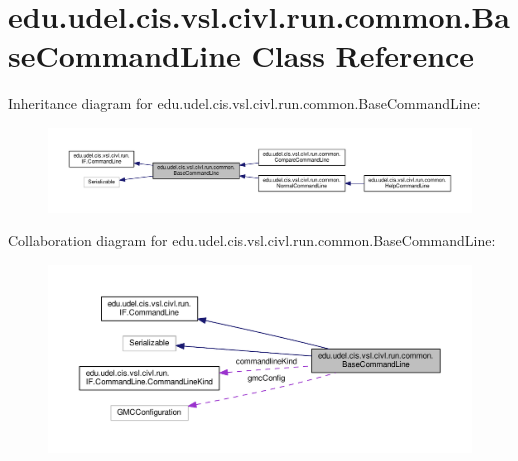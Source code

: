 \hypertarget{classedu_1_1udel_1_1cis_1_1vsl_1_1civl_1_1run_1_1common_1_1BaseCommandLine}{}\section{edu.\+udel.\+cis.\+vsl.\+civl.\+run.\+common.\+Base\+Command\+Line Class Reference}
\label{classedu_1_1udel_1_1cis_1_1vsl_1_1civl_1_1run_1_1common_1_1BaseCommandLine}


Inheritance diagram for edu.\+udel.\+cis.\+vsl.\+civl.\+run.\+common.\+Base\+Command\+Line\+:
\nopagebreak
\begin{figure}[H]
\begin{center}
\leavevmode
\includegraphics[width=350pt]{classedu_1_1udel_1_1cis_1_1vsl_1_1civl_1_1run_1_1common_1_1BaseCommandLine__inherit__graph}
\end{center}
\end{figure}


Collaboration diagram for edu.\+udel.\+cis.\+vsl.\+civl.\+run.\+common.\+Base\+Command\+Line\+:
\nopagebreak
\begin{figure}[H]
\begin{center}
\leavevmode
\includegraphics[width=350pt]{classedu_1_1udel_1_1cis_1_1vsl_1_1civl_1_1run_1_1common_1_1BaseCommandLine__coll__graph}
\end{center}
\end{figure}
